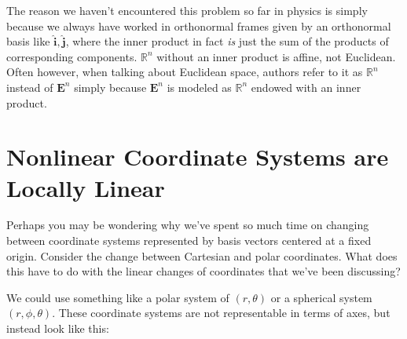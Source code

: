 \documentclass[../master.tex]{subfiles}
\begin{document}
	The reason we haven't encountered this problem so far in physics is simply because we always have worked in orthonormal frames given by an orthonormal basis like $\hat{\mathbf{i}}, \hat{\mathbf{j}}$, where the inner product in fact \emph{is} just the sum of the products of corresponding components. $\mathbb{R}^n$ without an inner product is affine, not Euclidean. Often however, when talking about Euclidean space, authors refer to it as $\mathbb{R}^n$ instead of $\mathbf{E}^n$ simply because $\mathbf{E}^n$ is modeled as $\mathbb{R}^n$ endowed with an inner product.
	
	


	\section[Nonlinear Coordinate Systems are Locally Linear]{Nonlinear Coordinate Systems are\\ Locally Linear}%
	\label{sec:nonlinear_coordinate_systems_are_locally_linear}
	
	Perhaps you may be wondering why we've spent so much time on changing between coordinate systems represented by basis vectors centered at a fixed origin. Consider the change between Cartesian and polar coordinates. What does this have to do with the linear changes of coordinates that we've been discussing?
	
	We could use something like a polar system of $(r,\theta)$ or a spherical system $(r, \phi, \theta)$. These coordinate systems are not representable in terms of axes, but instead look like this:
	
	
\end{document}
